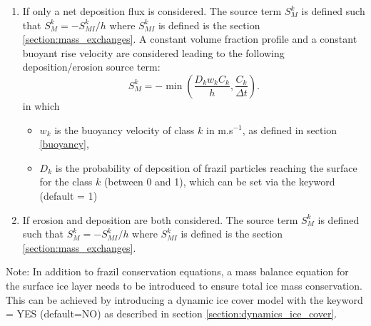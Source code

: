 \begin{enumerate}
\item 
If  only a net deposition flux is considered.
The source term $S_M^k$ is defined such that $S_M^k = -S_{MI}^k / h$ where $S_{MI}^k$ is defined is the section \ref{section:mass_exchanges}.
A constant volume fraction profile and a constant buoyant rise velocity are considered
leading to the following deposition/erosion source term: 
\begin{equation}
S_M^k= -\min \left( \dfrac{ D_k w_k C_k}{h} , \dfrac{C_k}{\Delta t} \right).
\end{equation}
in which
\begin{itemize}
	\item $w_k$ is the buoyancy velocity of class $k$ in m.s$^{-1}$, as defined in section \ref{buoyancy},
    \item $D_k$ is the probability of deposition of frazil particles reaching the surface for the class $k$ (between 0 and 1), which can be set via the keyword  (default = 1)
\end{itemize}

\item 
If  erosion and deposition are both considered. 
The source term $S_M^k$ is defined such that $S_M^k = -S_{MI}^k / h$ where $S_{MI}^k$ is defined is the section \ref{section:mass_exchanges}.

\end{enumerate}

\begin{WarningBlock}{Note:}
In addition to frazil conservation equations, a mass balance equation for the surface ice layer needs to be introduced to ensure total ice mass conservation. This can be achieved by introducing a dynamic ice cover model 
with the keyword  = YES (default=NO) as described in section \ref{section:dynamics_ice_cover}.
\end{WarningBlock}


